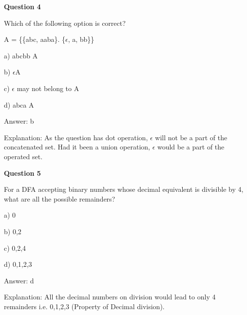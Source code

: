 \documentclass{article}
\begin{document}
\begin{mdframed}[linewidth=1pt, roundcorner=5pt, linecolor=gray!30, backgroundcolor=gray!5]
\textbf{Question 4} 

Which of the following option is correct?

A = \{\{abc, aaba\}. \{$\epsilon$, a, bb\}\}

a) abcbb \textcent  A

b) $\epsilon$\textcent A

c) $\epsilon$ may not belong to A

d) abca \textcent  A
\vspace{5pt} \par
\begin{tcolorbox}[colback=green!5, colframe=green!40!black, title=Solution]
Answer: b

Explanation: As the question has dot operation, $\epsilon$ will not be a part of the concatenated set. Had it been a union operation, $\epsilon$ would be a part of the operated set.
\end{tcolorbox}
\end{mdframed}

\begin{mdframed}[linewidth=1pt, roundcorner=5pt, linecolor=gray!30, backgroundcolor=gray!5]
\textbf{Question 5} 

For a DFA accepting binary numbers whose decimal equivalent is divisible by 4, what are all the possible remainders?

a) 0

b) 0,2

c) 0,2,4

d) 0,1,2,3
\vspace{5pt} \par
\begin{tcolorbox}[colback=green!5, colframe=green!40!black, title=Solution]
Answer: d

Explanation: All the decimal numbers on division would lead to only 4 remainders i.e. 0,1,2,3 (Property of Decimal division).

\end{tcolorbox}
\end{mdframed}
\newpage
\end{document}
